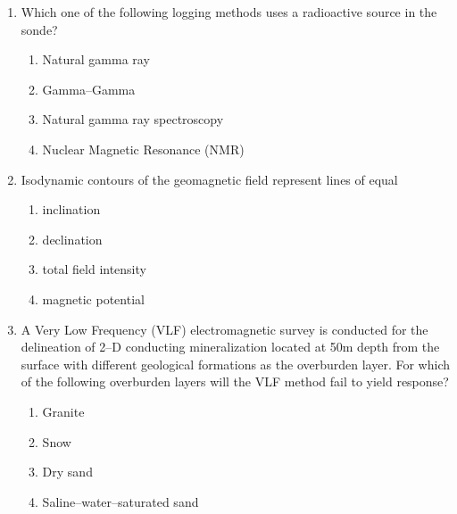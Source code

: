 \documentclass[journal,12pt,onecolumn]{IEEEtran}
\theoremstyle{remark}
\begin{document}
\begin{enumerate}[resume]
\item Which one of the following logging methods uses a radioactive source in the sonde?  
\begin{enumerate}
\item Natural gamma ray
\item Gamma--Gamma
\item Natural gamma ray spectroscopy
\item Nuclear Magnetic Resonance (NMR)
\end{enumerate}

\item Isodynamic contours of the geomagnetic field represent lines of equal  
\begin{enumerate}
\item inclination
\item declination
\item total field intensity
\item magnetic potential
\end{enumerate}

\item A Very Low Frequency (VLF) electromagnetic survey is conducted for the delineation of 2--D conducting mineralization located at 50m depth from the surface with different geological formations as the overburden layer. For which of the following overburden layers will the VLF method fail to yield response?  
\begin{enumerate}
\item Granite
\item Snow
\item Dry sand
\item Saline--water--saturated sand
\end{enumerate}
\end{enumerate}
\end{document}

